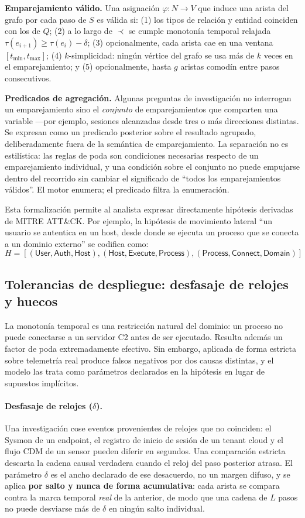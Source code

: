 \documentclass[11pt,a4paper]{article}
\begin{document}
\textbf{Emparejamiento válido.} Una asignación $\varphi : N \to V$ que induce
una arista del grafo por cada paso de $S$ es válida si: (1) los tipos de
relación y entidad coinciden con los de $Q$; (2) a lo largo de $\prec$ se
cumple monotonía temporal relajada $\tau(e_{i+1}) \geq \tau(e_i) - \delta$;
(3) opcionalmente, cada arista cae en una ventana $[t_{\min}, t_{\max}]$;
(4) $k$-simplicidad: ningún vértice del grafo se usa más de $k$ veces en el
emparejamiento; y (5) opcionalmente, hasta $g$ aristas comodín entre pasos
consecutivos.

\textbf{Predicados de agregación.} Algunas preguntas de investigación no
interrogan un emparejamiento sino el \emph{conjunto} de emparejamientos que
comparten una variable ---por ejemplo, sesiones alcanzadas desde tres o más
direcciones distintas. Se expresan como un predicado posterior sobre el
resultado agrupado, deliberadamente fuera de la semántica de emparejamiento.
La separación no es estilística: las reglas de poda son condiciones necesarias
respecto de un emparejamiento individual, y una condición sobre el conjunto no
puede empujarse dentro del recorrido sin cambiar el significado de ``todos los
emparejamientos válidos''. El motor enumera; el predicado filtra la
enumeración.

Esta formalización permite al analista expresar directamente hipótesis
derivadas de MITRE ATT\&CK. Por ejemplo, la hipótesis de movimiento lateral
``un usuario se autentica en un host, desde donde se ejecuta un proceso que se
conecta a un dominio externo'' se codifica como:
\[
H = [(\mathsf{User}, \mathsf{Auth}, \mathsf{Host}),
(\mathsf{Host}, \mathsf{Execute}, \mathsf{Process}),
(\mathsf{Process}, \mathsf{Connect}, \mathsf{Domain})]
\]

\subsection{Tolerancias de despliegue: desfasaje de relojes y huecos}
\label{sec:tolerancias}
La monotonía temporal es una restricción natural del dominio: un proceso no puede
conectarse a un servidor C2 antes de ser ejecutado. Resulta además un factor de
poda extremadamente efectivo. Sin embargo, aplicada de forma estricta sobre
telemetría real produce falsos negativos por dos causas distintas, y el modelo
las trata como parámetros declarados en la hipótesis en lugar de supuestos
implícitos.

\paragraph{Desfasaje de relojes ($\delta$).} Una investigación cose eventos
provenientes de relojes que no coinciden: el Sysmon de un endpoint, el registro
de inicio de sesión de un tenant cloud y el flujo CDM de un sensor pueden
diferir en segundos. Una comparación estricta descarta la cadena causal
verdadera cuando el reloj del paso posterior atrasa. El parámetro $\delta$ es
el ancho declarado de ese desacuerdo, no un margen difuso, y se aplica
\textbf{por salto y nunca de forma acumulativa}: cada arista se compara contra
la marca temporal \emph{real} de la anterior, de modo que una cadena de $L$
pasos no puede desviarse más de $\delta$ en ningún salto individual.
\end{document}
